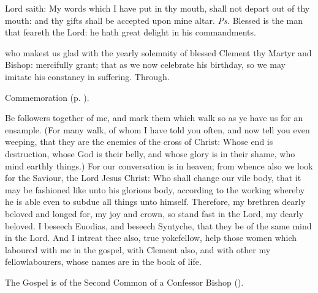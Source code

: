 \introit
{} Lord saith: My words which I have put in thy mouth, shall not depart out of thy mouth: and thy gifts shall be accepted upon mine altar. \textit{Ps.} Blessed is the man that feareth the Lord: he hath great delight in his commandments.

\collect
{} who makest us glad with the yearly solemnity of blessed Clement thy Martyr and Bishop: mercifully grant; that as we now celebrate his birthday, so we may imitate his constancy in suffering. Through.

\begin{rubric}
    Commemoration  (p. \pageref{FelicityCollect}).
\end{rubric}

 Be followers together of me, and mark them which walk so as ye have us for an ensample. (For many walk, of whom I have told you often, and now tell you even weeping, that they are the enemies of the cross of Christ: Whose end is destruction, whose God is their belly, and whose glory is in their shame, who mind earthly things.) For our conversation is in heaven; from whence also we look for the Saviour, the Lord Jesus Christ: Who shall change our vile body, that it may be fashioned like unto his glorious body, according to the working whereby he is able even to subdue all things unto himself. Therefore, my brethren dearly beloved and longed for, my joy and crown, so stand fast in the Lord, my dearly beloved. I beseech Euodias, and beseech Syntyche, that they be of the same mind in the Lord. And I intreat thee also, true yokefellow, help those women which laboured with me in the gospel, with Clement also, and with other my fellowlabourers, whose names are in the book of life.


\begin{rubric}
	The Gospel is of the Second Common of a Confessor Bishop (\pageref{CommonConfessorBishopIIGospel}).
\end{rubric}


\vspace{-0.2\baselineskip}

